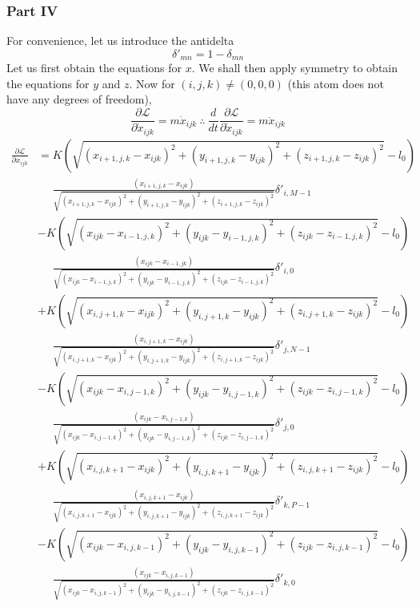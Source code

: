 \documentclass[letterpaper,12pt]{article}
\newcommand*{\deriv}[2]{\frac{d #1}{d #2}}
\newcommand*{\pderiv}[2]{\frac{\partial #1}{\partial #2}}
\begin{document}
\begin{flushleft}
    \subsubsection*{Part IV}
    For convenience, let us introduce the antidelta
    $$\delta'_{mn} = 1 - \delta_{mn}$$
    Let us first obtain the equations for $x$. We shall then apply symmetry to obtain the equations for $y$ and $z$. Now for $(i,j,k) \neq (0,0,0)$ (this atom does not have any degrees of freedom),
    $$\pderiv{\mathcal{L}}{\dot{x}_{ijk}} = m\dot{x}_{ijk} \: \therefore \: \deriv{}{t}\pderiv{\mathcal{L}}{\dot{x}_{ijk}} = m\ddot{x}_{ijk}$$
    \begin{align*}
        \pderiv{\mathcal{L}}{x_{ijk}} &= K\left(\sqrt{(x_{i+1,j,k} - x_{ijk})^2 + (y_{i+1,j,k} - y_{ijk})^2 + (z_{i+1,j,k} - z_{ijk})^2} - l_0\right)\\&\mathrel{\phantom{=}}\frac{(x_{i+1,j,k} - x_{ijk})}{\sqrt{(x_{i+1,j,k} - x_{ijk})^2 + (y_{i+1,j,k} - y_{ijk})^2 + (z_{i+1,j,k} - z_{ijk})^2}}\delta'_{i,M-1} \\
        &- K\left(\sqrt{(x_{ijk} - x_{i-1,j,k})^2 + (y_{ijk} - y_{i-1,j,k})^2 + (z_{ijk} - z_{i-1,j,k})^2} - l_0\right)\\&\mathrel{\phantom{=}}\frac{(x_{ijk} - x_{i-1,jk})}{\sqrt{(x_{ijk} - x_{i-1,j,k})^2 + (y_{ijk} - y_{i-1,j,k})^2 + (z_{ijk} - z_{i-1,j,k})^2}}\delta'_{i,0} \\
        &+ K\left(\sqrt{(x_{i,j+1,k} - x_{ijk})^2 + (y_{i,j+1,k} - y_{ijk})^2 + (z_{i,j+1,k} - z_{ijk})^2} - l_0\right)\\&\mathrel{\phantom{=}}\frac{(x_{i,j+1,k} - x_{ijk})}{\sqrt{(x_{i,j+1,k} - x_{ijk})^2 + (y_{i,j+1,k} - y_{ijk})^2 + (z_{i,j+1,k} - z_{ijk})^2}}\delta'_{j,N-1} \\
        &- K\left(\sqrt{(x_{ijk} - x_{i,j-1,k})^2 + (y_{ijk} - y_{i,j-1,k})^2 + (z_{ijk} - z_{i,j-1,k})^2} - l_0\right)\\&\mathrel{\phantom{=}}\frac{(x_{ijk} - x_{i,j-1,k})}{\sqrt{(x_{ijk} - x_{i,j-1,k})^2 + (y_{ijk} - y_{i,j-1,k})^2 + (z_{ijk} - z_{i,j-1,k})^2}}\delta'_{j,0} \\
        &+ K\left(\sqrt{(x_{i,j,k+1} - x_{ijk})^2 + (y_{i,j,k+1} - y_{ijk})^2 + (z_{i,j,k+1} - z_{ijk})^2} - l_0\right)\\&\mathrel{\phantom{=}}\frac{(x_{i,j,k+1} - x_{ijk})}{\sqrt{(x_{i,j,k+1} - x_{ijk})^2 + (y_{i,j,k+1} - y_{ijk})^2 + (z_{i,j,k+1} - z_{ijk})^2}}\delta'_{k,P-1} \\
        &- K\left(\sqrt{(x_{ijk} - x_{i,j,k-1})^2 + (y_{ijk} - y_{i,j,k-1})^2 + (z_{ijk} - z_{i,j,k-1})^2} - l_0\right)\\&\mathrel{\phantom{=}}\frac{(x_{ijk} - x_{i,j,k-1})}{\sqrt{(x_{ijk} - x_{i,j,k-1})^2 + (y_{ijk} - y_{i,j,k-1})^2 + (z_{ijk} - z_{i,j,k-1})^2}}\delta'_{k,0}

\end{align*}
\end{flushleft}
\end{document}
